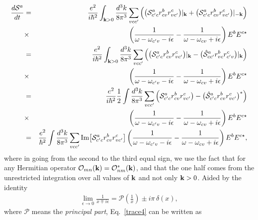 \documentclass[floatfix,prb,aps,superscriptaddress,11pt]{revtex4}
\begin{document}
\begin{eqnarray}\label{trace41}
\frac{d{\cal S}^a}{dt}
&=&
\frac{e^2}{i\hbar^2}
\int_{\mathbf{k}>0}\frac{d^3k}{8\pi^3}
\sum_{vcc'}
\Big(
\big(
{\cal S}^a_{c'c}r^b_{cv}r^c_{vc'}\big)|_{\mathbf{k}}
+
\big(
{\cal S}^a_{c'c}r^b_{cv}r^c_{vc'}\big)|_{-\mathbf{k}}
\Big)
\nonumber\\
&\times&
\left(
\frac{1}{\omega-\omega_{c'v}-i\epsilon}
-
\frac{1}
{\omega-\omega_{cv}+i\epsilon}
\right)
E^bE^{c\star}
\nonumber \\
&=&
\frac{e^2}{i\hbar^2}
\int_{\mathbf{k}>0}\frac{d^3k}{8\pi^3}
\sum_{vcc'}
\Big(
\big(
{\cal S}^a_{c'c}r^b_{cv}r^c_{vc'}\big)|_{\mathbf{k}}
-
\big(
\hat{\cal S}^a_{cc'}r^b_{vc}r^c_{c'v}\big)|_{\mathbf{k}}
\Big)
\nonumber\\
&\times&
\left(
\frac{1}{\omega-\omega_{c'v}-i\epsilon}
-
\frac{1}
{\omega-\omega_{cv}+i\epsilon}
\right)
E^bE^{c\star}
\nonumber \\
&=&
\frac{e^2}{i\hbar^2}
\frac{1}{2}\int\frac{d^3k}{8\pi^3}
\sum_{vcc'}
\Big(
{\cal S}^a_{c'c}r^b_{cv}r^c_{vc'}\big)
-
\big(
\hat{\cal S}^a_{c'c}r^b_{cv}r^c_{vc'}\big)^*
\Big)
\nonumber\\
&\times&
\left(
\frac{1}{\omega-\omega_{c'v}-i\epsilon}
-
\frac{1}
{\omega-\omega_{cv}+i\epsilon}
\right)
E^bE^{c\star}
\nonumber \\
&=&
\frac{e^2}{\hbar^2}
\int\frac{d^3k}{8\pi^3}
\sum_{vcc'}
\mbox{Im}\big[
{\cal S}^a_{c'c}r^b_{cv}r^c_{vc'}
\big]
\left(
\frac{1}{\omega-\omega_{c'v}-i\epsilon}
-
\frac{1}
{\omega-\omega_{cv}+i\epsilon}
\right)
E^bE^{c\star}
,
\end{eqnarray} 
where in going from the second to the third equal sign, we use the
fact that for any Hermitian operator 
${\cal O}_{mn}(\mathbf{k})={\cal O}^*_{nm}(\mathbf{k})$, and that the one half
comes from the unrestricted integration over all values of $\mathbf{k}$ and
not only $\mathbf{k}>0$.
Aided by the identity
\begin{eqnarray}
  \label{eq:25}
\lim_{\epsilon\to 0}  \frac{1}{x\mp i\epsilon}=
\mathcal{P}(\frac{1}{x}) \pm
 i \pi\, \delta(x),
\end{eqnarray}
where $\mathcal{P}$ means the \textit{principal part},
Eq.~\eqref{trace4} can be written as
\end{document}
